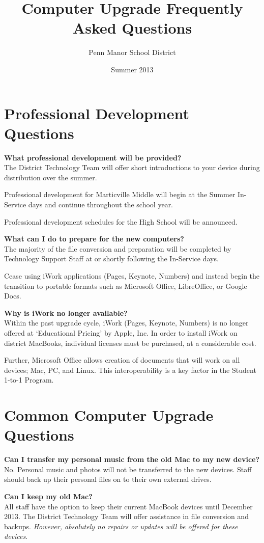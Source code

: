 \documentclass[10pt,foldmark,notumble]{leaflet}
\title{Computer Upgrade Frequently Asked Questions}
\author{Penn Manor School District}
\date{Summer 2013}
\begin{document}
\maketitle
\thispagestyle{empty}
\section{Professional Development Questions\color{red}\hrulefill\color{black}}
\textbf{What professional development will be provided?}\\
The District Technology Team will offer short introductions to your device during distribution over the summer.

Professional development for Marticville Middle will begin at the Summer In-Service days and continue throughout the school year.

Professional development schedules for the High School will be announced.

\textbf{What can I do to prepare for the new computers?}\\
The majority of the file conversion and preparation will be completed by Technology Support Staff at or shortly following the In-Service days.

Cease using iWork applications (Pages, Keynote, Numbers) and instead begin the transition to portable formats such as Microsoft Office, LibreOffice, or Google Docs.

\textbf{Why is iWork no longer available?}\\
Within the past upgrade cycle, iWork (Pages, Keynote, Numbers) is no longer offered at `Educational Pricing' by Apple, Inc.
In order to install iWork on district MacBooks, individual licenses must be purchased, at a considerable cost.

Further, Microsoft Office allows creation of documents that will work on all devices; Mac, PC, and Linux.
This interoperability is a key factor in the Student 1-to-1 Program.

\section{Common Computer Upgrade Questions\color{red}\hrulefill\color{black}}
\textbf{Can I transfer my personal music from the old Mac to my new device?}\\
No. Personal music and photos will not be transferred to the new devices. Staff should back up their personal files on to their own external drives.

\textbf{Can I keep my old Mac?}\\
All staff have the option to keep their current MacBook devices until December 2013. The District Technology Team will offer assistance in file conversion and backups. \emph{However, absolutely no repairs or updates will be offered for these devices}.
\end{document}
